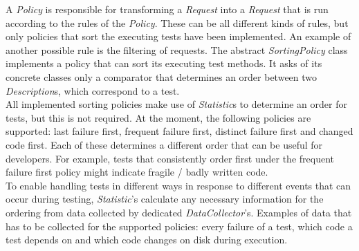 \documentclass[i2]{oss}
\newcommand{\class}[1]{\emph{#1}}
\begin{document}
A \class{Policy} is responsible for transforming a \class{Request} into a \class{Request} that is run according to the rules of the \class{Policy}. 
These can be all different kinds of rules, but only policies that sort the executing tests have been implemented. 
An example of another possible rule is the filtering of requests.
The abstract \class{SortingPolicy} class implements a policy that can sort its executing test methods. It asks of its concrete classes only a comparator that determines an order between two \class{Description}s, which correspond to a test.\\
All implemented sorting policies make use of \class{Statistic}s to determine
an order for tests, but this is not required.
At the moment, the following policies are supported: last failure first, 
frequent failure first, distinct failure first and changed code 
first.
Each of these determines a different order that can be useful for
developers.
For example, tests that consistently order first under the frequent
failure first policy might indicate fragile / badly written code. \\

To enable handling tests in different ways in response to different 
events that can occur during testing, \class{Statistic}'s calculate any 
necessary information for the ordering from data collected by dedicated 
\class{DataCollector}'s. %
Examples of data that has to be collected for the supported policies: 
every failure of a test, which code a test depends on and which code 
changes on disk during execution.\\
\end{document}
